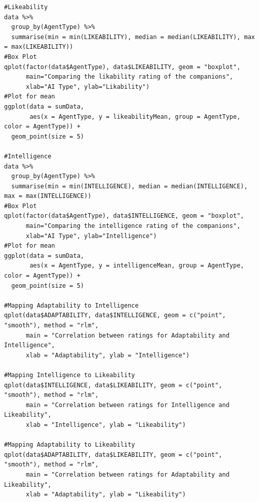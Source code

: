\documentclass{IEEEtran}
\begin{document}
\begin{verbatim}
#Likeability
data %>%
  group_by(AgentType) %>%
  summarise(min = min(LIKEABILITY), median = median(LIKEABILITY), max = max(LIKEABILITY))
#Box Plot
qplot(factor(data$AgentType), data$LIKEABILITY, geom = "boxplot", 
      main="Comparing the likability rating of the companions", 
      xlab="AI Type", ylab="Likability")
#Plot for mean
ggplot(data = sumData,
       aes(x = AgentType, y = likeabilityMean, group = AgentType, color = AgentType)) +
  geom_point(size = 5)

#Intelligence
data %>%
  group_by(AgentType) %>%
  summarise(min = min(INTELLIGENCE), median = median(INTELLIGENCE), max = max(INTELLIGENCE))
#Box Plot
qplot(factor(data$AgentType), data$INTELLIGENCE, geom = "boxplot", 
      main="Comparing the intelligence rating of the companions", 
      xlab="AI Type", ylab="Intelligence")
#Plot for mean
ggplot(data = sumData,
       aes(x = AgentType, y = intelligenceMean, group = AgentType, color = AgentType)) +
  geom_point(size = 5)

#Mapping Adaptability to Intelligence
qplot(data$ADAPTABILITY, data$INTELLIGENCE, geom = c("point", "smooth"), method = "rlm",
      main = "Correlation between ratings for Adaptability and Intelligence", 
      xlab = "Adaptability", ylab = "Intelligence")

#Mapping Intelligence to Likeability
qplot(data$INTELLIGENCE, data$LIKEABILITY, geom = c("point", "smooth"), method = "rlm",
      main = "Correlation between ratings for Intelligence and Likeability", 
      xlab = "Intelligence", ylab = "Likeability")

#Mapping Adaptability to Likeability
qplot(data$ADAPTABILITY, data$LIKEABILITY, geom = c("point", "smooth"), method = "rlm",
      main = "Correlation between ratings for Adaptability and Likeability", 
      xlab = "Adaptability", ylab = "Likeability")


\end{verbatim}
\end{document}
